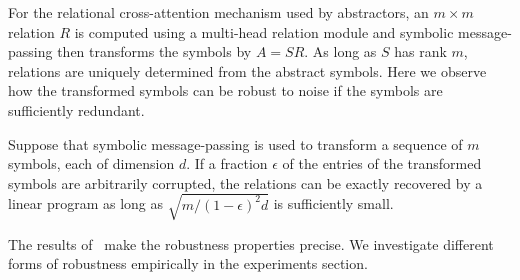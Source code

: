 For the relational cross-attention mechanism used by abstractors, an \(m\times m\) relation \(R\) is computed using a multi-head relation module and symbolic message-passing then transforms the symbols by
\(A = SR\). %
As long as \(S\) has rank \(m\), relations are uniquely determined from the abstract symbols. Here we observe how the transformed symbols can be robust to noise if the symbols are sufficiently redundant.

\begin{result}
Suppose that symbolic message-passing is used to transform a sequence of $m$ symbols, each of dimension $d$. If a fraction $\epsilon$ of the entries of the transformed symbols are arbitrarily corrupted, the relations can be exactly recovered by a linear program as long as $\sqrt{m/(1-\epsilon)^2d}$ is sufficiently small.
\end{result}

The results of~\cite{model_repair} make the robustness properties precise. We investigate different forms of robustness empirically in the experiments section.
